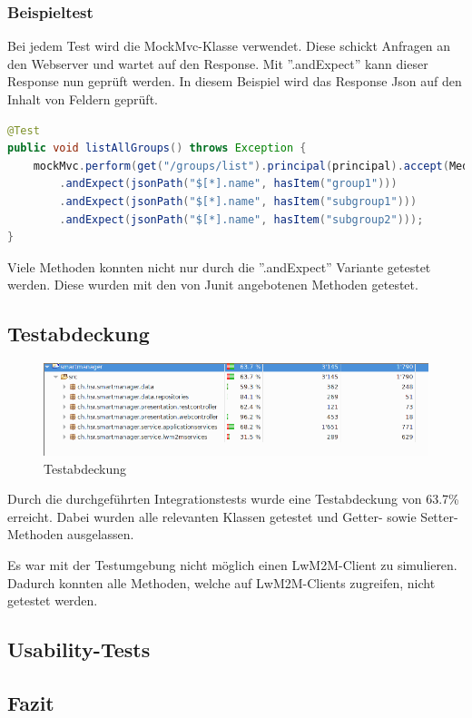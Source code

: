 \subsubsection{Beispieltest}
Bei jedem Test wird die MockMvc-Klasse verwendet. Diese schickt Anfragen an den Webserver und wartet auf den Response. Mit ''.andExpect'' kann dieser Response nun geprüft werden. In diesem Beispiel wird das Response Json auf den Inhalt von Feldern geprüft.
\begin{lstlisting}[language=java]
@Test
public void listAllGroups() throws Exception {
	mockMvc.perform(get("/groups/list").principal(principal).accept(MediaType.APPLICATION_JSON))
		.andExpect(jsonPath("$[*].name", hasItem("group1")))
		.andExpect(jsonPath("$[*].name", hasItem("subgroup1")))
		.andExpect(jsonPath("$[*].name", hasItem("subgroup2")));
}
\end{lstlisting}

Viele Methoden konnten nicht nur durch die ''.andExpect'' Variante getestet werden. Diese wurden mit den von Junit angebotenen Methoden getestet.
\subsection{Testabdeckung}
\begin{figure}[H]
\centering
\includegraphics[scale=0.5]{../04_Realisierung/images/testcoverage.png}
\caption{Testabdeckung}
\end{figure}

Durch die durchgeführten Integrationstests wurde eine Testabdeckung von 63.7\% erreicht. Dabei wurden alle relevanten Klassen getestet und Getter- sowie Setter-Methoden ausgelassen.

Es war mit der Testumgebung nicht möglich einen LwM2M-Client zu simulieren. Dadurch konnten alle Methoden, welche auf LwM2M-Clients zugreifen, nicht getestet werden.
\subsection{Usability-Tests}

\subsection{Fazit}
